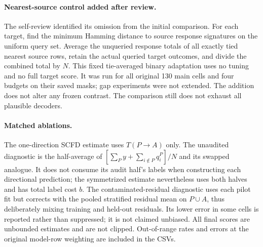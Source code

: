 \paragraph{Nearest-source control added after review.}
The self-review identified its omission from the initial comparison. For each target, find the minimum Hamming distance to source response signatures on the uniform query set. Average the unqueried response totals of all exactly tied nearest source rows, retain the actual queried target outcomes, and divide the combined total by $N$. This fixed tie-averaged binary adaptation uses no tuning and no full target score. It was run for all original 130 main cells and four budgets on their saved masks; gap experiments were not extended. The addition does not alter any frozen contrast. The comparison still does not exhaust all plausible decoders.

\paragraph{Matched ablations.}
The one-direction SCFD estimate uses $T(P\to A)$ only. The unaudited diagnostic is the half-average of $[\sum_P y+\sum_{i\notin P}q_i^P]/N$ and its swapped analogue. It does not consume its audit half's labels when constructing each directional prediction; the symmetrized estimate nevertheless uses both halves and has total label cost $b$. The contaminated-residual diagnostic uses each pilot fit but corrects with the pooled stratified residual mean on $P\cup A$, thus deliberately mixing training and held-out residuals. Its lower error in some cells is reported rather than suppressed; it is not claimed unbiased. All final scores are unbounded estimates and are not clipped. Out-of-range rates and errors at the original model-row weighting are included in the CSVs.


